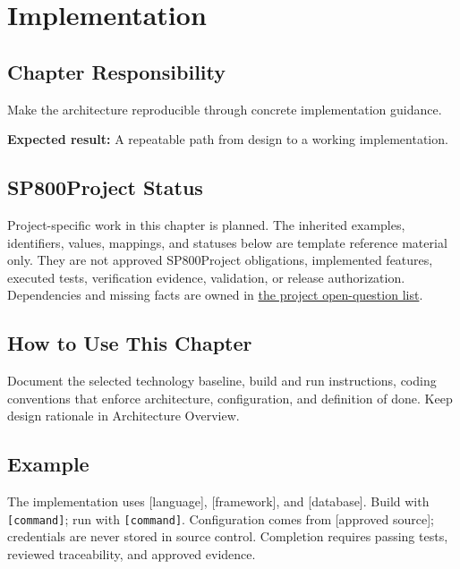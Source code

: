 \chapter{Implementation}
\section{Chapter Responsibility}
\label{Section:ImplementationResponsibility}
Make the architecture reproducible through concrete implementation guidance.

\noindent\textbf{Expected result:} A repeatable path from design to a working implementation.

\section{SP800Project Status}
\label{Section:SP800StatusImplementation}
Project-specific work in this chapter is planned. The inherited examples,
identifiers, values, mappings, and statuses below are template reference
material only. They are not approved SP800Project obligations, implemented features,
executed tests, verification evidence, validation, or release authorization.
Dependencies and missing facts are owned in
\hyperref[Section:SP800OpenQuestions]{the project open-question list}.

\section{How to Use This Chapter}
Document the selected technology baseline, build and run instructions, coding conventions that enforce architecture, configuration, and definition of done. Keep design rationale in Architecture Overview.
\section{Example}
The implementation uses [language], [framework], and [database]. Build with \texttt{[command]}; run with \texttt{[command]}. Configuration comes from [approved source]; credentials are never stored in source control. Completion requires passing tests, reviewed traceability, and approved evidence.
